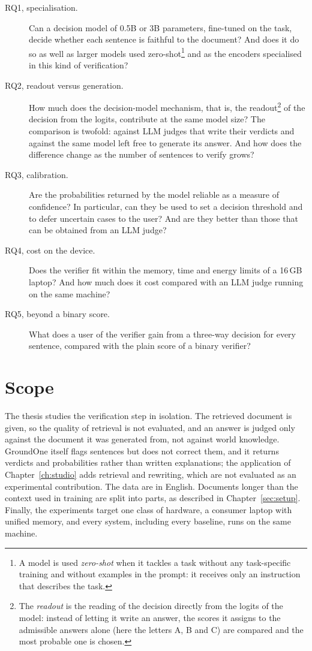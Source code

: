 \begin{description}
\item[RQ1, specialisation.] Can a decision model of 0.5B or 3B parameters, fine-tuned on the task, decide whether each
sentence is faithful to the document? And does it do so as well as larger models used zero-shot\footnote{A model is
used \emph{zero-shot} when it tackles a task without any task-specific training and without examples in the prompt: it
receives only an instruction that describes the task.} and as the encoders specialised in this kind of verification?
\item[RQ2, readout versus generation.] How much does the decision-model mechanism, that is, the readout\footnote{The
\emph{readout} is the reading of the decision directly from the logits of the model: instead of letting it write an
answer, the scores it assigns to the admissible answers alone (here the letters A, B and C) are compared and the most
probable one is chosen.} of the decision from the logits, contribute at the same model size? The comparison is twofold:
against LLM judges that write their verdicts and against the same model left free to generate its answer. And how
does the difference change as the number of sentences to verify grows?
\item[RQ3, calibration.] Are the probabilities returned by the model reliable as a measure of confidence? In
particular, can they be used to set a decision threshold and to defer uncertain cases to the user? And are they better
than those that can be obtained from an LLM judge?
\item[RQ4, cost on the device.] Does the verifier fit within the memory, time and energy limits of a 16\,GB laptop? And
how much does it cost compared with an LLM judge running on the same machine?
\item[RQ5, beyond a binary score.] What does a user of the verifier gain from a three-way decision for every sentence,
compared with the plain score of a binary verifier?
\end{description}

\section{Scope}
\label{sec:intro-scope}

The thesis studies the verification step in isolation. The retrieved document is given, so the quality of retrieval is
not evaluated, and an answer is judged only against the document it was generated from, not against world knowledge.
GroundOne itself flags sentences but does not correct them, and it returns verdicts and probabilities rather than
written explanations; the application of Chapter~\ref{ch:studio} adds retrieval and rewriting, which are not evaluated
as an experimental contribution. The data are in English. Documents longer than the context used in training are split into parts, as
described in Chapter~\ref{sec:setup}. Finally, the experiments target one class of hardware, a consumer laptop with
unified memory, and every system, including every baseline, runs on the same machine.

